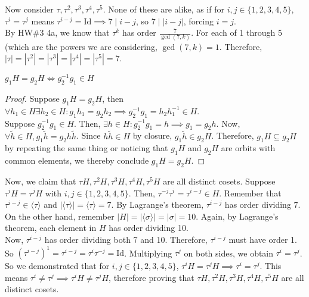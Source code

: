 \documentclass{amsart}
\begin{document}
\begin{enumerate}
\begin{enumerate}
    Now consider $\tau,\tau^2,\tau^3,\tau^4,\tau^5$. None of these are alike, as if for $i,j\in\{1,2,3,4,5\}$, $\tau^i=\tau^j$ means $\tau^{i-j}=\mathrm{Id}\implies7\mid i-j$, so $7\mid |i-j|$, forcing $i=j$.\\
    
    By HW\#3 4a, we know that $\tau^k$ has order $\frac7{\gcd(7,k)}$. For each of 1 through 5 (which are the powers we are considering, $\gcd(7,k)=1$. Therefore, $|\tau|=|\tau^2|=|\tau^3|=|\tau^4|=|\tau^5|=7$.

    \begin{lemma}
        $g_1H=g_2H\iff g_2^{-1}g_1\in H$
    \end{lemma}

    \begin{proof}
        Suppose $g_1H=g_2H$, then $\forall h_1\in H\exists h_2\in H:g_1h_1=g_2h_2\implies g_2^{-1}g_1=h_2h_1^{-1}\in H$.\\

        Suppose $g_2^{-1}g_1\in H$. Then, $\exists h\in H:g_2^{-1}g_1=h\implies g_1=g_2h$. Now, $\forall \tilde{h}\in H,g_1\tilde{h}=g_2h\tilde{h}$. Since $h\tilde{h}\in H$ by closure, $g_1\tilde{h}\in g_2H$. Therefore, $g_1H\subseteq g_2H$ by repeating the same thing or noticing that $g_1H$ and $g_2H$ are orbits with common elements, we thereby conclude $g_1H=g_2H$.
        
    \end{proof}

    Now, we claim that $\tau H,\tau^2H,\tau^3H,\tau^4H,\tau^5H$ are all distinct cosets. Suppose $\tau^iH=\tau^jH$ with $i,j\in\{1,2,3,4,5\}$. Then, $\tau^{-j}\tau^{i}=\tau^{i-j}\in H$. Remember that $\tau^{i-j}\in\langle\tau\rangle$ and $|\langle\tau\rangle|=\langle\tau\rangle=7$. By Lagrange's theorem, $\tau^{i-j}$ has order dividing 7.\\
    
    On the other hand, remember $|H|=|\langle\sigma\rangle|=|\sigma|=10$. Again, by Lagrange's theorem, each element in $H$ has order dividing 10.\\

    Now, $\tau^{i-j}$ has order dividing both 7 and 10. Therefore, $\tau^{i-j}$ must have order 1. So $(\tau^{i-j})^1=\tau^{i-j}=\tau^i\tau^{-j}=\mathrm{Id}$. Multiplying $\tau^j$ on both sides, we obtain $\tau^i=\tau^j$. So we demonstrated that for $i,j\in\{1,2,3,4,5\}$, $\tau^iH=\tau^jH\implies \tau^i=\tau^j$. This means $\tau^i\neq\tau^j\implies\tau^iH\neq\tau^jH$, therefore proving that $\tau H,\tau^2H,\tau^3H,\tau^4H,\tau^5H$ are all distinct cosets.
    

\end{enumerate}
\end{enumerate}
\end{document}

